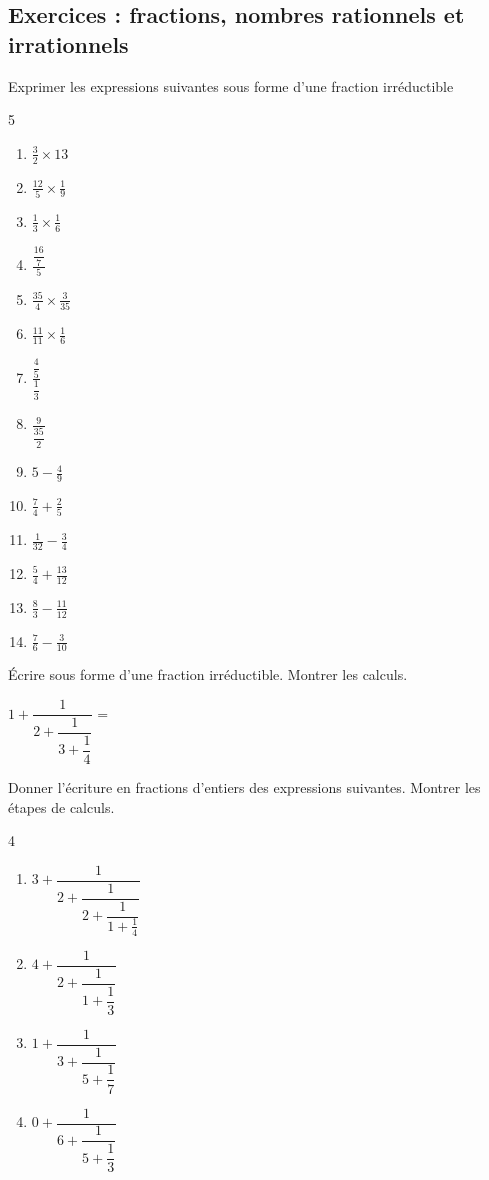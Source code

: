 \subsection{Exercices : fractions, nombres rationnels et irrationnels}
\begin{exercise}[\cancel{\faCalculator}] Exprimer les expressions suivantes sous forme d'une fraction irréductible 
	\begin{multicols}{5} 
		\begin{enumerate}[label={$\Alph*=$\rule{0pt}{1.8em}}, leftmargin=*]
			\item $\frac{3}{2}\times 13$
			\item $\frac{12}{5}\times \frac{1}{9}$
			\item $\frac{1}{3}\times \frac{1}{6}$
			\item $\frac{\dfrac{16}{7}}{5}$
			\item $\frac{35}{4}\times \frac{3}{35}$
			\item $\frac{11}{11}\times \frac{1}{6}$
			\item $\frac{\dfrac{4}{5}}{\dfrac{1}{3}}$ 
			\item $\frac{9}{\dfrac{35}{2}}$
			\item $5-\frac{4}{9}$
			\item $\frac{7}{4}+\frac{2}{5}$
			\item $\frac{1}{32}-\frac{3}{4}$ 
			\item $\frac{5}{4}+\frac{13}{12}$
			\item $\frac{8}{3}-\frac{11}{12}$
			\item $\frac{7}{6}-\frac{3}{10}$
		\end{enumerate}
	\end{multicols}
\end{exercise}
\begin{example} Écrire sous forme d'une fraction irréductible. Montrer les calculs.
 
\noindent\parbox{1\linewidth}{
$1+\dfrac{1}{2+\dfrac{1}{3+\dfrac{1}{4}}}= $
} 
\end{example}
\begin{exercise} \label{chapitre02:fractioncontinues:01} Donner l'écriture en fractions d'entiers des expressions suivantes. Montrer les étapes de calculs.
	
	\begin{multicols}{4}
		\begin{enumerate}[label={$\Alph*=$}]
			\item $3+\dfrac{1}{2+ \dfrac{1}{2+\dfrac{1}{1+\frac{1}{4}}}} $
			\item $4+\dfrac{1}{2+\dfrac{1}{1+\dfrac{1}{3}}}$ 
			\item $1+\dfrac{1}{3+\dfrac{1}{5+\dfrac{1}{7}}}$ 
			\item $0+\dfrac{1}{6+\dfrac{1}{5+\dfrac{1}{3}}}$ 
		\end{enumerate}
	\end{multicols} 
\end{exercise}

